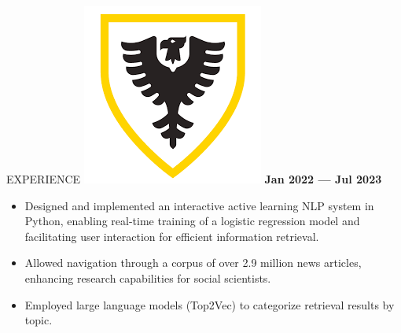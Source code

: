 \documentclass{resume}
\begin{document}
\begin{rSection}{EXPERIENCE}
\includegraphics[height=3\fontcharht\font`\B]{dal_logo.png}%
 \hfill \textbf{Jan 2022 --- Jul 2023}\vspace{-0.2cm}
\begin{itemize}
   \item Designed and implemented an interactive active learning NLP system in Python, enabling real-time training of a logistic regression model and facilitating user interaction for efficient information retrieval.\vspace{-0.2cm}
   \item Allowed navigation through a corpus of over 2.9 million news articles, enhancing research capabilities for social scientists.\vspace{-0.2cm}
   \item Employed large language models (Top2Vec) to categorize retrieval results by topic.
\end{itemize}




\end{rSection}
\end{document}
